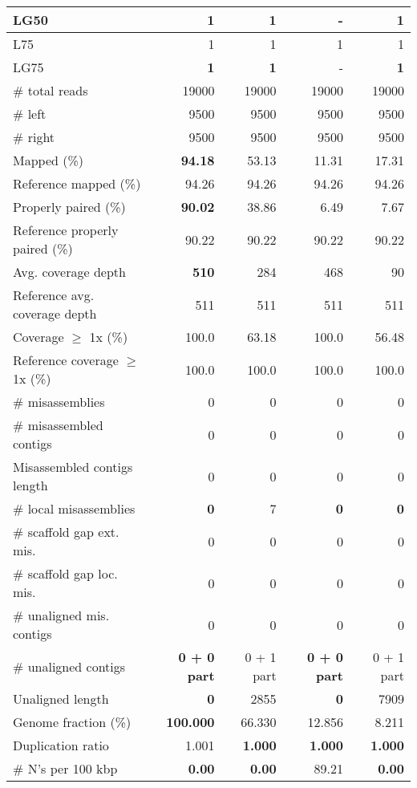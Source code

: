 \documentclass[12pt,a4paper]{article}
\begin{document}
\begin{table}[ht]
\begin{center}
\begin{tabular}{|l*{4}{|r}|}
LG50 & {\bf 1} & {\bf 1} & - & {\bf 1} \\ \hline
L75 & 1 & 1 & 1 & 1 \\ \hline
LG75 & {\bf 1} & {\bf 1} & - & {\bf 1} \\ \hline
\# total reads & 19000 & 19000 & 19000 & 19000 \\ \hline
\# left & 9500 & 9500 & 9500 & 9500 \\ \hline
\# right & 9500 & 9500 & 9500 & 9500 \\ \hline
Mapped (\%) & {\bf 94.18} & 53.13 & 11.31 & 17.31 \\ \hline
Reference mapped (\%) & 94.26 & 94.26 & 94.26 & 94.26 \\ \hline
Properly paired (\%) & {\bf 90.02} & 38.86 & 6.49 & 7.67 \\ \hline
Reference properly paired (\%) & 90.22 & 90.22 & 90.22 & 90.22 \\ \hline
Avg. coverage depth & {\bf 510} & 284 & 468 & 90 \\ \hline
Reference avg. coverage depth & 511 & 511 & 511 & 511 \\ \hline
Coverage $\geq$ 1x (\%) & 100.0 & 63.18 & 100.0 & 56.48 \\ \hline
Reference coverage $\geq$ 1x (\%) & 100.0 & 100.0 & 100.0 & 100.0 \\ \hline
\# misassemblies & 0 & 0 & 0 & 0 \\ \hline
\# misassembled contigs & 0 & 0 & 0 & 0 \\ \hline
Misassembled contigs length & 0 & 0 & 0 & 0 \\ \hline
\# local misassemblies & {\bf 0} & 7 & {\bf 0} & {\bf 0} \\ \hline
\# scaffold gap ext. mis. & 0 & 0 & 0 & 0 \\ \hline
\# scaffold gap loc. mis. & 0 & 0 & 0 & 0 \\ \hline
\# unaligned mis. contigs & 0 & 0 & 0 & 0 \\ \hline
\# unaligned contigs & {\bf 0 + 0 part} & 0 + 1 part & {\bf 0 + 0 part} & 0 + 1 part \\ \hline
Unaligned length & {\bf 0} & 2855 & {\bf 0} & 7909 \\ \hline
Genome fraction (\%) & {\bf 100.000} & 66.330 & 12.856 & 8.211 \\ \hline
Duplication ratio & 1.001 & {\bf 1.000} & {\bf 1.000} & {\bf 1.000} \\ \hline
\# N's per 100 kbp & {\bf 0.00} & {\bf 0.00} & 89.21 & {\bf 0.00} \\ \hline

\end{tabular}
\end{center}
\end{table}
\end{document}
